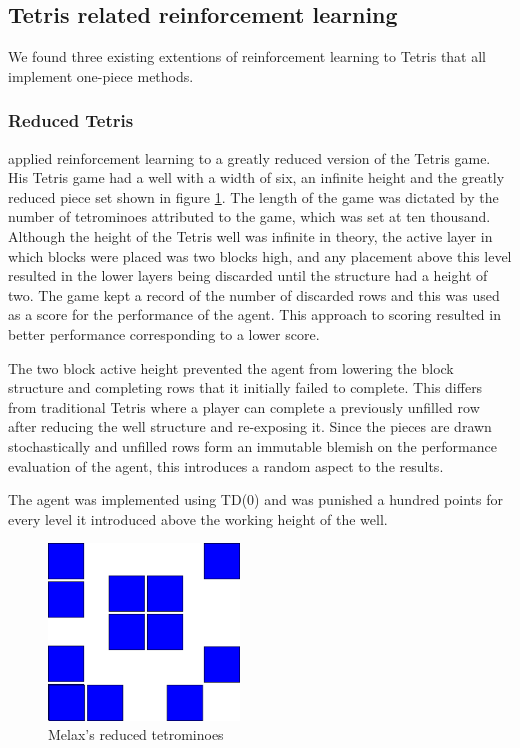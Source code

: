 \documentclass{rucsthesis}
\begin{document}
\subsection{Tetris related reinforcement learning}

We found three existing extentions of reinforcement learning to Tetris that all implement one-piece methods.

\subsubsection{Reduced Tetris}

\cite{melaxtetris} applied reinforcement learning to a greatly reduced version of the Tetris game. His Tetris game had a well with a width of six, an infinite height and the greatly reduced piece set shown in figure \ref{fig:melaxpieces}. The length of the game was dictated by the number of tetrominoes attributed to the game, which was set at ten thousand. Although the height of the Tetris well was infinite in theory, the active layer in which blocks were placed was two blocks high, and any placement above this level resulted in the lower layers being discarded until the structure had a height of two. The game kept a record of the number of discarded rows and this was used as a score for the performance of the agent. This approach to scoring resulted in better performance corresponding to a lower score. 

The two block active height prevented the agent from lowering the block structure and completing rows that it initially failed to complete. This differs from traditional Tetris where a player can complete a previously unfilled row after reducing the well structure and re-exposing it. Since the pieces are drawn stochastically and unfilled rows form an immutable blemish on the performance evaluation of the agent, this introduces a random aspect to the results.

The agent was implemented using TD(0) and was punished a hundred points for every level it introduced above the working height of the well.

\begin{figure}[h]
\centering
\includegraphics[width=2in]{reducedblocks.png}
\caption{Melax's reduced tetrominoes}
\label{fig:melaxpieces}
\end{figure}
\end{document}
